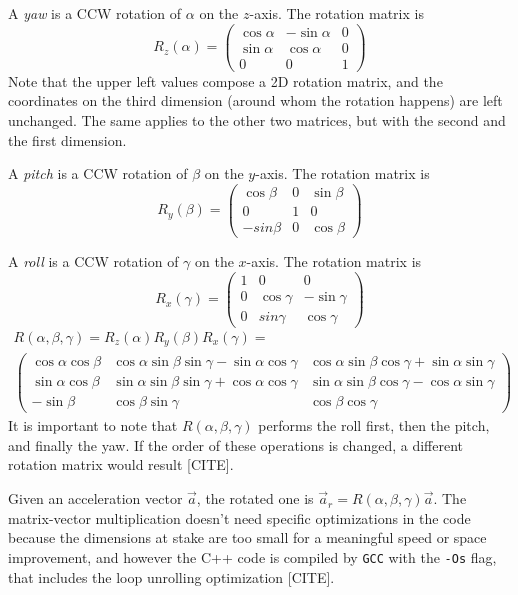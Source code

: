 A \textit{yaw} is a CCW rotation of $\alpha$ on the $z$-axis. The rotation matrix is
\[
	R_z(\alpha) =
	\begin{pmatrix}
		\cos\alpha & -\sin\alpha & 0 \\
		\sin\alpha & \cos\alpha & 0 \\
		0 & 0 & 1
	\end{pmatrix}
\]
Note that the upper left values compose a 2D rotation matrix, and the coordinates on the third dimension (around whom the rotation happens) are left unchanged. The same applies to the other two matrices, but with the second and the first dimension.
\bigbreak

A \textit{pitch} is a CCW rotation of $\beta$ on the $y$-axis. The rotation matrix is
\[
	R_y(\beta) =
	\begin{pmatrix}
		\cos\beta & 0 & \sin\beta \\
		0 & 1 & 0 \\
		-sin\beta & 0 & \cos\beta
	\end{pmatrix}
\]

A \textit{roll} is a CCW rotation of $\gamma$ on the $x$-axis. The rotation matrix is
\[
	R_x(\gamma) =
	\begin{pmatrix}
		1 & 0 & 0 \\
		0 & \cos\gamma & -\sin\gamma \\
		0 & sin\gamma & \cos\gamma
	\end{pmatrix}
\]
\begin{gather*}
	R(\alpha, \beta, \gamma) = R_z(\alpha) R_y(\beta) R_x(\gamma) = \\
	\begin{pmatrix}
		\cos\alpha \cos\beta & \cos\alpha \sin\beta \sin\gamma - \sin\alpha \cos\gamma & \cos\alpha \sin\beta \cos\gamma + \sin\alpha \sin\gamma \\
		\sin\alpha \cos\beta & \sin\alpha \sin\beta \sin\gamma + \cos\alpha \cos\gamma & \sin\alpha \sin\beta \cos\gamma - \cos\alpha \sin\gamma \\
		-\sin\beta & \cos\beta \sin\gamma & \cos\beta \cos\gamma
	\end{pmatrix}
\end{gather*}
It is important to note that $R(\alpha, \beta, \gamma)$ performs the roll first, then the pitch, and finally the yaw. If the order of these operations is changed, a different rotation matrix would result [CITE].
\bigbreak

Given an acceleration vector $\vec a$, the rotated one is $\vec a_r = R(\alpha, \beta, \gamma) \vec a$.
The matrix-vector multiplication doesn't need specific optimizations in the code because the dimensions at stake are too small for a meaningful speed or space improvement, and however the C++ code is compiled by \texttt{GCC} with the \texttt{-Os} flag, that includes the loop unrolling optimization [CITE].
\bigbreak


